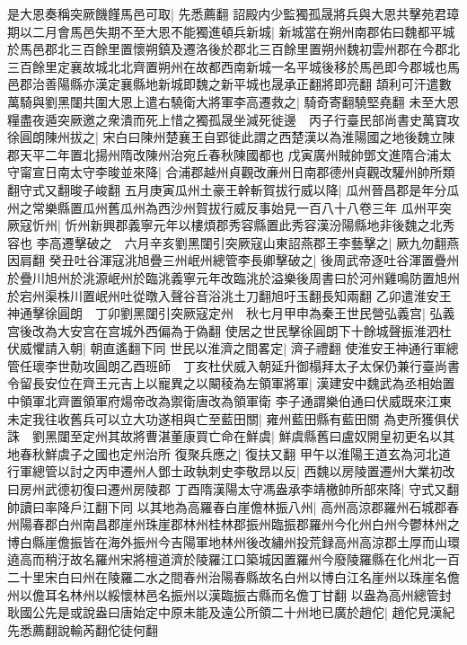 是大恩奏稱突厥饑饉馬邑可取|{
	先悉薦翻}
詔殿内少監獨孤晟將兵與大恩共擊苑君璋期以二月會馬邑失期不至大恩不能獨進頓兵新城|{
	新城當在朔州南郡佑曰魏都平城於馬邑郡北三百餘里置懷朔鎮及遷洛後於郡北三百餘里置朔州魏初雲州郡在今郡北三百餘里定襄故城北北齊置朔州在故都西南新城一名平城後移於馬邑即今郡城也馬邑郡治善陽縣亦漢定襄縣地新城即魏之新平城也晟承正翻將即亮翻}
頡利可汗遣數萬騎與劉黑闥共圍大恩上遣右驍衛大將軍李高遷救之|{
	騎奇寄翻驍堅堯翻}
未至大恩糧盡夜遁突厥邀之衆潰而死上惜之獨孤晟坐減死徙邊　丙子行臺民部尚書史萬寶攻徐圓朗陳州拔之|{
	宋白曰陳州楚襄王自郢徙此謂之西楚漢以為淮陽國之地後魏立陳郡天平二年置北揚州隋改陳州治宛丘春秋陳國都也}
戊寅廣州賊帥鄧文進隋合浦太守甯宣日南太守李晙並來降|{
	合浦郡越州貞觀改亷州日南郡德州貞觀改驩州帥所類翻守式又翻晙子峻翻}
五月庚寅瓜州土豪王幹斬賀拔行威以降|{
	瓜州晉昌郡是年分瓜州之常樂縣置瓜州舊瓜州為西沙州賀拔行威反事始見一百八十八卷三年}
瓜州平突厥寇忻州|{
	忻州新興郡義寧元年以樓煩郡秀容縣置此秀容漢汾陽縣地非後魏之北秀容也}
李高遷擊破之　六月辛亥劉黑闥引突厥寇山東詔燕郡王李藝擊之|{
	厥九勿翻燕因肩翻}
癸丑吐谷渾寇洮旭疊三州岷州總管李長卿擊破之|{
	後周武帝逐吐谷渾置疊州於疊川旭州於洮源岷州於臨洮義寧元年改臨洮於溢樂後周書曰於河州雞鳴防置旭州於宕州渠株川置岷州吐從暾入聲谷音浴洮土刀翻旭吁玉翻長知兩翻}
乙卯遣淮安王神通擊徐圓朗　丁卯劉黑闥引突厥寇定州　秋七月甲申為秦王世民營弘義宫|{
	弘義宫後改為大安宫在宫城外西偏為于偽翻}
使居之世民擊徐圓朗下十餘城聲振淮泗杜伏威懼請入朝|{
	朝直遙翻下同}
世民以淮濟之間畧定|{
	濟子禮翻}
使淮安王神通行軍總管任瓌李世勣攻圓朗乙酉班師　丁亥杜伏威入朝延升御榻拜太子太保仍兼行臺尚書令留長安位在齊王元吉上以寵異之以闞稜為左領軍將軍|{
	漢建安中魏武為丞相始置中領軍北齊置領軍府煬帝改為禦衛唐改為領軍衛}
李子通謂樂伯通曰伏威既來江東未定我往收舊兵可以立大功遂相與亡至藍田關|{
	雍州藍田縣有藍田關}
為吏所獲俱伏誅　劉黑闥至定州其故將曹湛董康買亡命在鮮虞|{
	鮮虞縣舊曰盧奴開皇初更名以其地春秋鮮虞子之國也定州治所}
復聚兵應之|{
	復扶又翻}
甲午以淮陽王道玄為河北道行軍總管以討之丙申遷州人鄧士政執刺史李敬昂以反|{
	西魏以房陵置遷州大業初改曰房州武德初復曰遷州房陵郡}
丁酉隋漢陽太守馮盎承李靖檄帥所部來降|{
	守式又翻帥讀曰率降戶江翻下同}
以其地為高羅春白崖儋林振八州|{
	高州高涼郡羅州石城郡春州陽春郡白州南昌郡崖州珠崖郡林州桂林郡振州臨振郡羅州今化州白州今鬱林州之博白縣崖儋振皆在海外振州今吉陽軍地林州後改繡州投荒録高州高涼郡土厚而山環遶高而稍汙故名羅州宋將檀道濟於陵羅江口築城因置羅州今廢陵羅縣在化州北一百二十里宋白曰州在陵羅二水之間春州治陽春縣故名白州以博白江名崖州以珠崖名儋州以儋耳名林州以綏懷林邑名振州以漢臨振古縣而名儋丁甘翻}
以盎為高州總管封耿國公先是或說盎曰唐始定中原未能及遠公所領二十州地已廣於趙佗|{
	趙佗見漢紀先悉薦翻說輸芮翻佗徒何翻}
